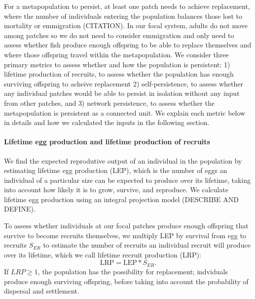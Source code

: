 \documentclass[12pt, oneside]{article}   	%
\begin{document}
For a metapopulation to persist, at least one patch needs to achieve replacement, where the number of individuals entering the population balances those lost to mortality or emmigration (CITATION). In our focal system, adults do not move among patches so we do not need to consider emmigration and only need to assess whether fish produce enough offspring to be able to replace themselves and where those offspring travel within the metapopulation. We consider three primary metrics to assess whether and how the population is persistent: 1) lifetime production of recruits, to assess whether the population has enough surviving offspring to acheive replacement 2) self-persistence, to assess whether any individual patches would be able to persist in isolation without any input from other patches, and 3) network persistence, to assess whether the metapopulation is persistent as a connected unit. We explain each metric below in details and how we calculated the inputs in the following section. %

\paragraph*{Lifetime egg production and lifetime production of recruits}

We find the expected reprodutive output of an individual in the population by estimating lifetime egg production (LEP), which is the number of eggs an individual of a particular size can be expected to produce over its lifetime, taking into account how likely it is to grow, survive, and reproduce. We calculate lifetime egg production using an integral projection model (DESCRIBE AND DEFINE).

To assess whether individuals at our focal patches produce enough offspring that survive to become recruits themselves, we multiply LEP by survival from egg to recruits $S_{ER}$ to estimate the number of recruits an individual recruit will produce over its lifetime, which we call lifetime recruit production (LRP):
\begin{equation}
\text{LRP} = \text{LEP} * S_{ER}. \label{EQN_LRP}
\end{equation}
If $LRP \geq 1$, the population has the possibility for replacement; indviduals produce enough surviving offspring, before taking into account the probability of dispersal and settlement. %
\end{document}
